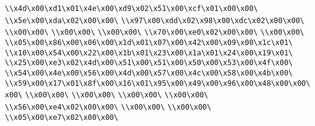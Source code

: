\verb|\\x4d\x00\xd1\x01\x4e\x00\xd9\x02\x51\x00\xcf\x01\x00\x00\|\newline
\verb|\\x5e\x00\xda\x02\x00\x00\|\newline
\verb|\\x97\x00\xdd\x02\x98\x00\xdc\x02\x00\x00\|\newline
\verb|\\x00\x00\|\newline
\verb|\\x00\x00\|\newline
\verb|\\x00\x00\|\newline
\verb|\\x70\x00\xe0\x02\x00\x00\|\newline
\verb|\\x00\x00\|\newline
\verb|\\x05\x00\x86\x00\x06\x00\x1d\x01\x07\x00\x42\x00\x09\x00\x1c\x01\|\newline
\verb|\\x10\x00\x54\x00\x22\x00\x1b\x01\x23\x00\x1a\x01\x24\x00\x19\x01\|\newline
\verb|\\x25\x00\xe3\x02\x4d\x00\x51\x00\x51\x00\x50\x00\x53\x00\x4f\x00\|\newline
\verb|\\x54\x00\x4e\x00\x56\x00\x4d\x00\x57\x00\x4c\x00\x58\x00\x4b\x00\|\newline
\verb|\\x59\x00\x17\x01\x8f\x00\x16\x01\x95\x00\x49\x00\x96\x00\x48\x00\x00\x00\|\newline
\verb|\\x00\x00\|\newline
\verb|\\x00\x00\|\newline
\verb|\\x00\x00\|\newline
\verb|\\x00\x00\|\newline
\verb|\\x56\x00\xe4\x02\x00\x00\|\newline
\verb|\\x00\x00\|\newline
\verb|\\x00\x00\|\newline
\verb|\\x05\x00\xe7\x02\x00\x00\|\newline

